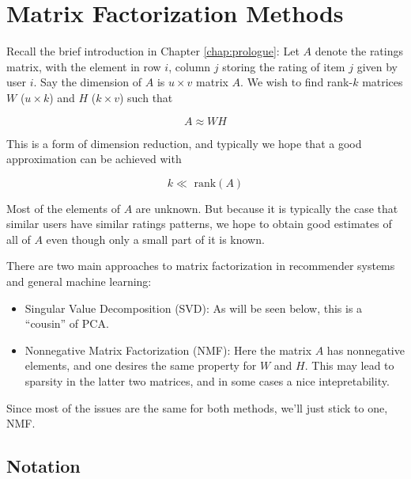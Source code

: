\chapter{Matrix Factorization Methods}  
\label{chap:svd} 


Recall the brief introduction in Chapter \ref{chap:prologue}:  Let $A$
denote the ratings matrix, with the element in row $i$, column $j$
storing the rating of item $j$ given by user $i$.  Say the dimension of
$A$ is $u \times v$ matrix $A$.  We wish to find rank-$k$ matrices $W$
($u \times k$) and $H$ ($k \times v$) such that

\begin{equation}
\label{awh}
A \approx W H
\end{equation}

This is a form of dimension reduction, and typically we hope that a good
approximation can be achieved with

\begin{equation}
k \ll \textrm{ rank}(A)
\end{equation}

Most of the elements of $A$ are unknown.  But because
it is typically the case that similar users have similar ratings
patterns, we hope to obtain good estimates of all of $A$ even though
only a small part of it is known.

There are two main approaches to matrix factorization in recommender
systems and general machine learning:

\begin{itemize}

\item Singular Value Decomposition (SVD):  As will be seen below, this
is a ``cousin'' of PCA.

\item Nonnegative Matrix Factorization (NMF): Here the matrix $A$ has
nonnegative elements, and one desires the same property for $W$ and $H$.
This may lead to sparsity in the latter two matrices, and in some cases
a nice intepretability.

\end{itemize} 

Since most of the issues are the same for both methods, we'll just stick
to one, NMF.

\section{Notation}

